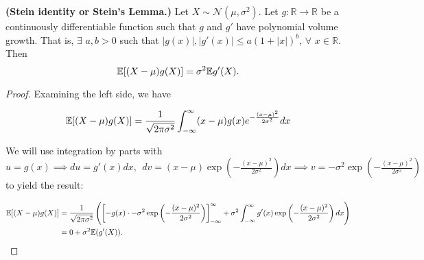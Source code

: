 %
%
%
%
%
%
%

\begin{theorem} \textbf{(Stein identity or Stein's Lemma.)}\label{prob.stein.id} Let $X \sim \mathcal{N}(\mu, \sigma^2)$.  Let $g : \mathbb{R}\to\mathbb{R}$ be a continuously differentiable function such that $g$ and $g'$ have polynomial volume growth.  That is, $\exists$ $a,b>0$ such that $|{g(x)}|,|g'(x)|\leq a(1+|x|)^{b}$, $\forall$ $x\in\mathbb{R}$. Then 
$$\mathbb{E}[ (X - \mu) g(X)] = \sigma^2\mathbb{E} g'(X).$$

\end{theorem}


\begin{proof}Examining the left side, we have

\[
\mathbb{E}[ (X - \mu) g(X)]  = \frac{1}{\sqrt{2 \pi \sigma^2}} \int_{-\infty}^\infty (x-\mu) g(x)  e^{-\frac{(x-\mu)^2}{2\sigma^2}} dx
\]

We will use integration by parts with \(u = g(x) \implies du = g'(x)dx, \ \ dv = (x-\mu) \exp \left( -\frac{(x-\mu)^2}{2\sigma^2} \right)  dx \implies v = - \sigma^2 \exp \left( -\frac{(x-\mu)^2}{2\sigma^2} \right)\) to yield the result:

\begin{align*}
\mathbb{E}[ (X - \mu) g(X)]  & =  \frac{1}{\sqrt{2 \pi \sigma^2}}  \left( \left[ -g(x) \cdot  - \sigma^2 \exp \left( -\frac{(x-\mu)^2}{2\sigma^2} \right) \right]_{-\infty}^\infty + \sigma^2  \int_{-\infty}^\infty g'(x)  \exp \left( -\frac{(x-\mu)^2}{2\sigma^2} \right) dx \right)
\\ & = 0 + \sigma^2 \mathbb{E}(g'(X)).
\end{align*}

\end{proof}

